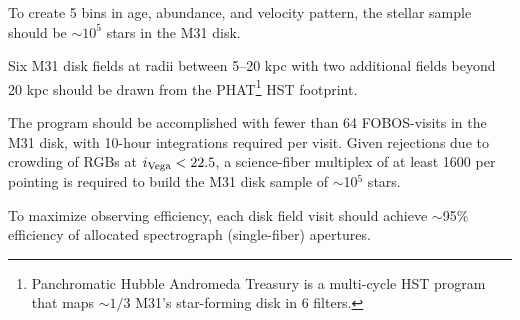 \documentclass[11pt,a4paper,twoside,onecolumn,openany,final,oldfontcommands]{memoir}
\begin{document}
\begin{programrequirement}
\reqitem To create 5 bins in age, abundance, and velocity pattern, the stellar sample should be $\sim 10^5$ stars in the M31 disk. \label{prog:lgdisks:sample} 

\reqitem Six M31 disk fields at radii between 5--20 kpc with two additional fields beyond 20 kpc should be drawn from the PHAT\footnote{Panchromatic Hubble Andromeda Treasury \citep{phat} is a multi-cycle HST program that maps $\sim1/3$ M31's star-forming disk in 6 filters.} HST footprint.  

\reqitem The program should be accomplished with fewer than 64 FOBOS-visits in the M31 disk, with 10-hour integrations required per visit.  Given rejections due to crowding \citep{dorman12} of RGBs at $i_{\rm Vega} < 22.5$, a science-fiber multiplex of at least 1600 per pointing is required to build the M31 disk sample of $\sim$10$^5$ stars.





\reqitem To maximize observing efficiency, each disk field visit should achieve $\sim$95\% efficiency of allocated spectrograph (single-fiber) apertures.


\end{programrequirement}
\end{document}
